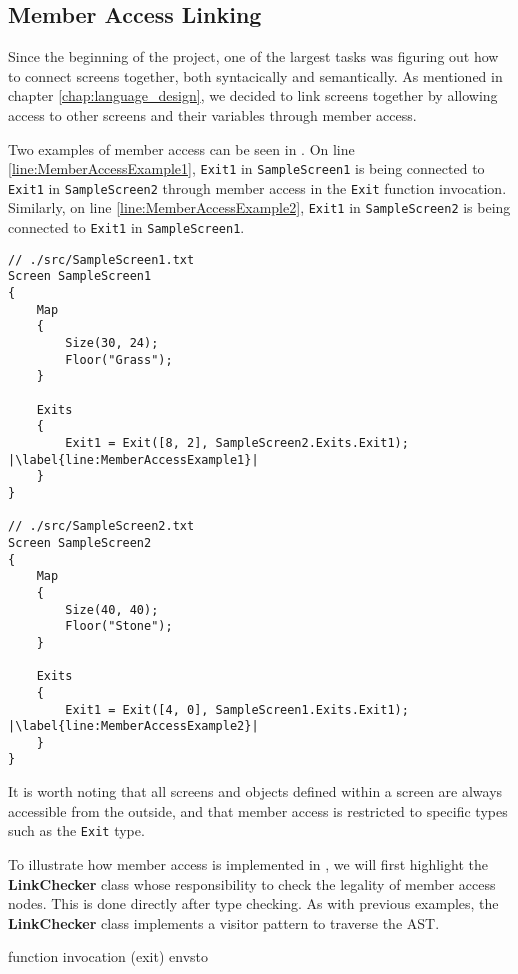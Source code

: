\subsection*{Member Access Linking} \label{sec:Linker}
Since the beginning of the project, one of the largest tasks was figuring out how to connect screens together, both syntacically and semantically. 
As mentioned in chapter \ref{chap:language_design}, we decided to link screens together by allowing access to other screens and their variables through member access. 


Two examples of member access can be seen in . 
On line \ref{line:MemberAccessExample1}, \texttt{Exit1} in \texttt{SampleScreen1} is being connected to \texttt{Exit1} in \texttt{SampleScreen2} through member access in the \texttt{Exit} function invocation.
Similarly, on line \ref{line:MemberAccessExample2}, \texttt{Exit1} in \texttt{SampleScreen2} is being connected to \texttt{Exit1} in \texttt{SampleScreen1}.

\begin{lstlisting}[language=CSharp, caption={\dazel{} source code example of member access.}, label={lst:LinkingExample},escapechar=|]
// ./src/SampleScreen1.txt
Screen SampleScreen1 
{
	Map 
	{
		Size(30, 24);
		Floor("Grass");
	}
	
	Exits 
	{
		Exit1 = Exit([8, 2], SampleScreen2.Exits.Exit1); |\label{line:MemberAccessExample1}|
	}
}

// ./src/SampleScreen2.txt
Screen SampleScreen2
{
	Map 
	{
		Size(40, 40);
		Floor("Stone");
	}
	
	Exits 
	{
		Exit1 = Exit([4, 0], SampleScreen1.Exits.Exit1); |\label{line:MemberAccessExample2}|
	}
}
\end{lstlisting}

It is worth noting that all screens and objects defined within a screen are always accessible from the outside, and that member access is restricted to specific types such as the \texttt{Exit} type.


To illustrate how member access is implemented in \dazel{}, we will first highlight the \textbf{LinkChecker} class whose responsibility to check the legality of member access nodes. This is done directly after type checking.
As with previous examples, the \textbf{LinkChecker} class implements a visitor pattern to traverse the AST.

function invocation (exit)
envsto 


